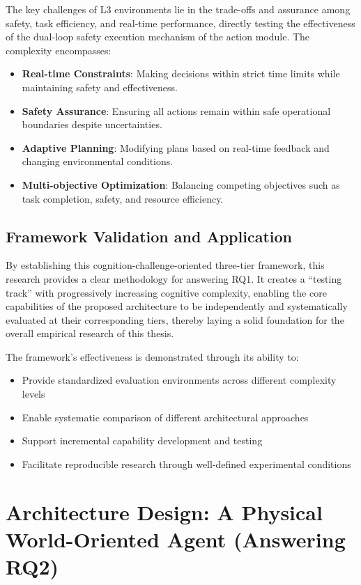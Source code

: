 The key challenges of L3 environments lie in the trade-offs and assurance among safety, task efficiency, and real-time performance, directly testing the effectiveness of the dual-loop safety execution mechanism of the action module. The complexity encompasses:
\begin{itemize}
\item \textbf{Real-time Constraints}: Making decisions within strict time limits while maintaining safety and effectiveness.
\item \textbf{Safety Assurance}: Ensuring all actions remain within safe operational boundaries despite uncertainties.
\item \textbf{Adaptive Planning}: Modifying plans based on real-time feedback and changing environmental conditions.
\item \textbf{Multi-objective Optimization}: Balancing competing objectives such as task completion, safety, and resource efficiency.
\end{itemize}

\subsection{Framework Validation and Application}

By establishing this cognition-challenge-oriented three-tier framework, this research provides a clear methodology for answering RQ1. It creates a ``testing track'' with progressively increasing cognitive complexity, enabling the core capabilities of the proposed architecture to be independently and systematically evaluated at their corresponding tiers, thereby laying a solid foundation for the overall empirical research of this thesis.

The framework's effectiveness is demonstrated through its ability to:
\begin{itemize}
\item Provide standardized evaluation environments across different complexity levels
\item Enable systematic comparison of different architectural approaches
\item Support incremental capability development and testing
\item Facilitate reproducible research through well-defined experimental conditions
\end{itemize}

\section{Architecture Design: A Physical World-Oriented Agent (Answering RQ2)}

